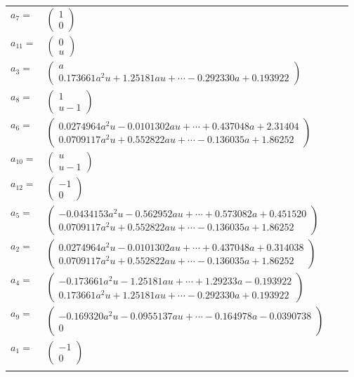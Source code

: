 \documentclass[1p]{elsarticle_modified}
\theoremstyle{definition}
\begin{document}
\begin{tabular}{m{7pt} m{180pt} m{7pt} m{180pt} }
\flushright $a_{7}=$&$\begin{pmatrix}1\\0\end{pmatrix}$ \\
\flushright $a_{11}=$&$\begin{pmatrix}0\\u\end{pmatrix}$ \\
\flushright $a_{3}=$&$\begin{pmatrix}a\\0.173661 a^{2} u+1.25181 a u+\cdots-0.292330 a+0.193922\end{pmatrix}$ \\
\flushright $a_{8}=$&$\begin{pmatrix}1\\u-1\end{pmatrix}$ \\
\flushright $a_{6}=$&$\begin{pmatrix}0.0274964 a^{2} u-0.0101302 a u+\cdots+0.437048 a+2.31404\\0.0709117 a^{2} u+0.552822 a u+\cdots-0.136035 a+1.86252\end{pmatrix}$ \\
\flushright $a_{10}=$&$\begin{pmatrix}u\\u-1\end{pmatrix}$ \\
\flushright $a_{12}=$&$\begin{pmatrix}-1\\0\end{pmatrix}$ \\
\flushright $a_{5}=$&$\begin{pmatrix}-0.0434153 a^{2} u-0.562952 a u+\cdots+0.573082 a+0.451520\\0.0709117 a^{2} u+0.552822 a u+\cdots-0.136035 a+1.86252\end{pmatrix}$ \\
\flushright $a_{2}=$&$\begin{pmatrix}0.0274964 a^{2} u-0.0101302 a u+\cdots+0.437048 a+0.314038\\0.0709117 a^{2} u+0.552822 a u+\cdots-0.136035 a+1.86252\end{pmatrix}$ \\
\flushright $a_{4}=$&$\begin{pmatrix}-0.173661 a^{2} u-1.25181 a u+\cdots+1.29233 a-0.193922\\0.173661 a^{2} u+1.25181 a u+\cdots-0.292330 a+0.193922\end{pmatrix}$ \\
\flushright $a_{9}=$&$\begin{pmatrix}-0.169320 a^{2} u-0.0955137 a u+\cdots-0.164978 a-0.0390738\\0\end{pmatrix}$ \\
\flushright $a_{1}=$&$\begin{pmatrix}-1\\0\end{pmatrix}$\\&\end{tabular}
\end{document}

